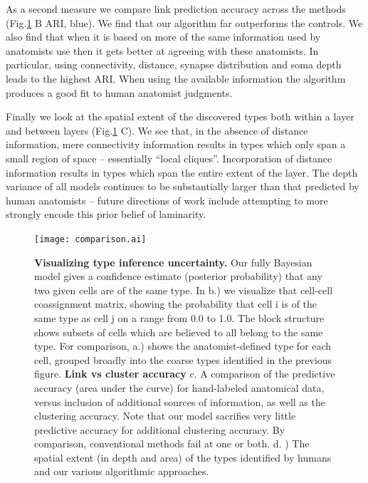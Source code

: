 \documentclass{article}
\begin{document}
As a second measure we compare link prediction accuracy across the
methods (Fig.\ref{fig:mouseretina_compare} B ARI, blue). We find that our
algorithm far outperforms the controls. We also find that when it is
based on more of the same information used by anatomists use then it
gets better at agreeing with these anatomists. In particular, using
connectivity, distance, synapse distribution and soma depth leads to
the highest ARI. When using the available information the algorithm
produces a good fit to human anatomist judgments.

Finally we look at the spatial extent of the discovered types both
within a layer and between layers (Fig.\ref{fig:mouseretina_compare}
C). We see that, in the absence of distance information, mere
connectivity information results in types which only span a small
region of space -- essentially “local cliques”. Incorporation of
distance information results in types which span the entire extent of
the layer. The depth variance of all models continues to be
substantially larger than that predicted by human anatomists -- future
directions of work include attempting to more strongly encode this
prior belief of laminarity.


\begin{figure}
  \centering 
  \centerline{\texttt{[image: comparison.ai]}}
  \caption{\textbf{Visualizing type inference uncertainty.} Our fully Bayesian model gives a confidence estimate (posterior probability) that any two given cells are of the same type. In b.) we visualize that cell-cell coassignment matrix, showing the probability that cell i is of the same type as cell j on a range from 0.0 to 1.0. The block structure shows subsets of cells which are believed to all belong to the same type. For comparison, a.) shows the anatomist-defined type for each cell, grouped broadly into the coarse types identified in the previous figure. \textbf{Link vs cluster accuracy} c. A comparison of the
    predictive accuracy (area under the curve) for hand-labeled
    anatomical data, versus inclusion of additional sources of
    information, as well as the clustering accuracy. Note that our model sacrifies very little predictive accuracy for additional clustering accuracy. By comparison, conventional methods fail at one or both.  d. ) The spatial extent (in depth and area) of the
    types identified by humans and our various algorithmic
    approaches.}

\label{fig:mouseretina_compare}
\end{figure}
\end{document}
